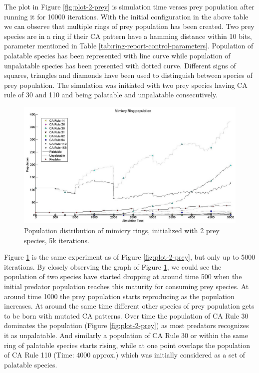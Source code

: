 The plot in Figure \ref{fig:plot-2-prey} is simulation time verses prey population after running it for 10000 iterations. With the initial configuration in the above table we can observe that multiple rings of prey population has been created. Two prey species are in a ring if their CA pattern have a hamming distance within 10 bits, parameter mentioned in Table \ref{tab:ring-report-control-parameters}. Population of palatable species has been represented with line curve while population of unpalatable species has been presented with dotted curve. Different signs of squares, triangles and diamonds have been used to distinguish between species of prey population. The simulation was initiated with two prey species having CA rule of 30 and 110 and being palatable and unpalatable consecutively.

\begin{figure}[H]
	\centering
	\includegraphics[scale=0.40]{images/simTime5k-2Prey}
	\caption[Population distribution of mimicry rings (2 prey species, 5k iterations)]{Population distribution of mimicry rings, initialized with 2 prey species, 5k iterations.}
	\label{fig:plot-2-prey-5k}
\end{figure}

Figure \ref{fig:plot-2-prey-5k} is the same experiment as of Figure \ref{fig:plot-2-prey}, but only up to 5000 iterations. By closely observing the graph of Figure \ref{fig:plot-2-prey-5k}, we could see the population of two species have started dropping at around time 500 when the initial predator population reaches this maturity for consuming prey species. At around time 1000 the prey population starts reproducing as the population increases. At around the same time different other species of prey population gets to be born with mutated CA patterns. Over time the population of CA Rule 30 dominates the population (Figure \ref{fig:plot-2-prey}) as most predators recognizes it as unpalatable. And similarly a population of CA Rule 30 or within the same ring of palatable species starts rising, while at one point overlaps the population of CA Rule 110 (Time: 4000 approx.) which was initially considered as a set of palatable species.

